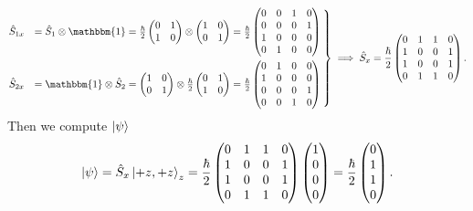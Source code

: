 \documentclass[12pt]{article}
\theoremstyle{definition}
\theoremstyle{definition}
\theoremstyle{definition}
\theoremstyle{definition}
\theoremstyle{definition}
\theoremstyle{example}
\theoremstyle{note}
\theoremstyle{remark}
\theoremstyle{example}
\begin{document}
 				$$\begin{rcases}
 					 \hat{S}_{1x} &= \hat{S}_{1} \otimes \mathbbm{1} = \frac{\hbar}{2} \begin{pmatrix}
 					 	0 & 1 \\ 1 & 0 
 					 \end{pmatrix}
 					 \otimes \begin{pmatrix}
 					 	1 & 0 \\ 0 & 1
 					 \end{pmatrix}
 					 = \frac{\hbar}{2} \begin{pmatrix}
 					 	 0 & 0 & 1 & 0\\0 & 0 & 0 & 1 \\
 					 	 1 & 0 & 0 & 0 \\
 					 	 0 & 1 & 0 & 0
 					 \end{pmatrix} \\
 					 \hat{S}_{2x} &= \mathbbm{1} \otimes \hat{S}_{2} = \begin{pmatrix}
 					 	1 & 0 \\ 0 & 1
 					 \end{pmatrix}
 					 \otimes \frac{\hbar}{2}  \begin{pmatrix}
 					 	0 & 1 \\ 1 & 0 
 					 \end{pmatrix} = \frac{\hbar}{2}\begin{pmatrix}
 					 	 0 & 1 & 0 & 0 \\
 					 	 1 & 0 & 0 & 0 \\
 					 	 0 & 0 & 0 & 1\\
 					 	 0 &  0& 1 & 0
 					 \end{pmatrix} \:
 				\end{rcases} \implies \hat{S}_{x} = \frac{\hbar}{2} \begin{pmatrix}
 				0 & 1 & 1 & 0 \\
 				1 & 0 & 0 & 1 \\
 				1 & 0 & 0 & 1 \\
 				0 & 1 & 1 & 0
 				\end{pmatrix}. $$
 				Then we compute $\ket{\psi}$ 
 				$$ \ket{\psi}  = \hat{S}_{x} \ket{+z,+z}_{z} =\frac{\hbar}{2} \begin{pmatrix}
 				0 & 1 & 1 & 0 \\
 				1 & 0 & 0 & 1 \\
 				1 & 0 & 0 & 1 \\
 				0 & 1 & 1 & 0
 				\end{pmatrix} \begin{pmatrix}
 					1 \\ 0 \\ 0 \\ 0
 				\end{pmatrix} = \frac{\hbar}{2} \begin{pmatrix}
 					 0 \\ 1 \\ 1 \\ 0
 				\end{pmatrix}.$$
\end{document}
